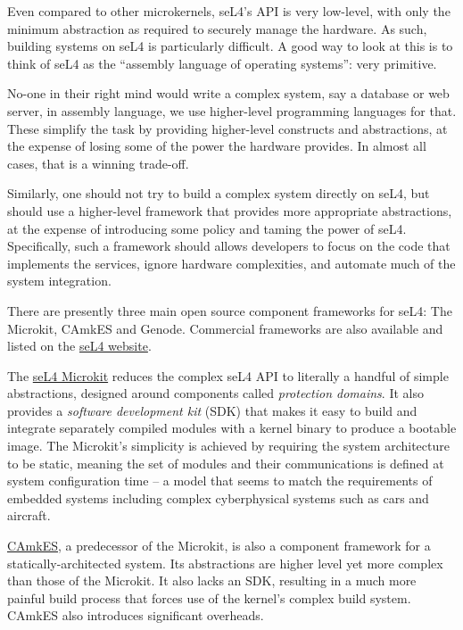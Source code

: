 \documentclass[english,a4paper,12pt]{report}
\begin{document}
  Even compared to other microkernels, seL4's API is very low-level,
  with only the minimum abstraction as required to securely manage the
  hardware. As such, building systems on seL4 is particularly
  difficult. A good way to look at this is to think of seL4 as the
  ``assembly language of operating systems'': very primitive.

  No-one in their right mind would write a complex system, say a
  database or web server, in assembly language, we use higher-level
  programming languages for that. These simplify the task by providing
  higher-level constructs and abstractions, at the expense of losing
  some of the power the hardware provides. In almost all cases, that
  is a winning trade-off.

  Similarly, one should not try to build a complex system directly on
  seL4, but should use a higher-level framework that provides more
  appropriate abstractions, at the expense of introducing some policy
  and taming the power of seL4. Specifically, such a framework should allows developers
  to focus on the code that implements the services, ignore hardware
  complexities, and automate
  much of the system integration.

  There are presently three main open source
  component frameworks for seL4: The Microkit, CAmkES
  and Genode. Commercial frameworks are also available and listed on the
  \href{https://sel4.systems/tools.html}{seL4 website}.

  The \href{https://docs.sel4.systems/projects/microkit/}{seL4 Microkit} reduces
  the complex seL4 API to literally a handful of simple abstractions,
  designed around components called \emph{protection domains}. It also
  provides a \emph{software development kit} (SDK) that makes it easy
  to build and integrate separately compiled modules with a kernel
  binary to produce a bootable image. The Microkit's simplicity is
  achieved by requiring the system architecture to be static, meaning
  the set of modules and their communications is defined at system
  configuration time -- a model that seems to match the requirements
  of embedded systems including complex
  cyberphysical systems such as cars and aircraft.

  \href{https://docs.sel4.systems/projects/camkes/}{CAmkES},
  a predecessor of the Microkit, is also a component
  framework for a statically-architected system. Its abstractions are
  higher level yet more complex than those of the Microkit. It also
  lacks an SDK, resulting in a much more painful build process that
  forces use of the kernel's complex build system. CAmkES also
  introduces significant overheads.
\end{document}
